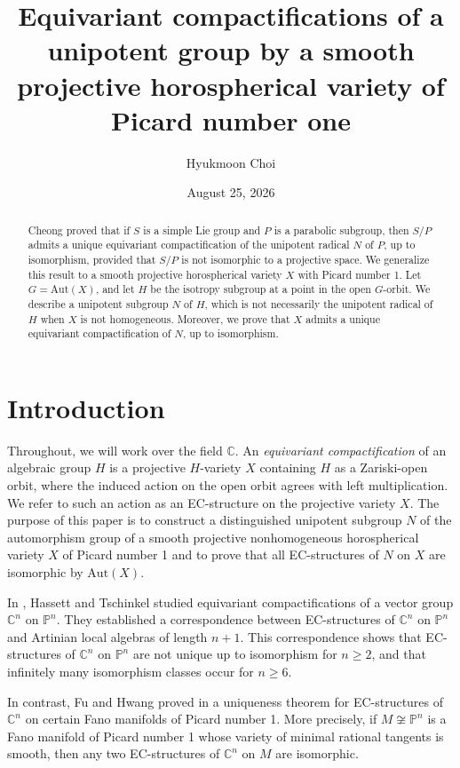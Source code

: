 \documentclass{amsart}
\title[EC structures on certain horospherical varieties]{Equivariant compactifications of a unipotent group by a smooth projective horospherical variety of Picard number one}
\author{Hyukmoon Choi}
\date{August 25, 2026}
\theoremstyle{definition}
\theoremstyle{remark}
\newcommand{\C}{\mathbb{C}}
\begin{document}
\begin{abstract}
Cheong proved that if $S$ is a simple Lie group and $P$ is a parabolic subgroup, then $S/P$ admits a unique equivariant compactification of the unipotent radical $N$ of $P$, up to isomorphism, provided that $S/P$ is not isomorphic to a projective space. We generalize this result to a smooth projective horospherical variety $X$ with Picard number 1. Let $G = \mathrm{Aut}(X)$, and let $H$ be the isotropy subgroup at a point in the open $G$-orbit. We describe a unipotent subgroup $N$ of $H$, which is not necessarily the unipotent radical of $H$ when $X$ is not homogeneous. Moreover, we prove that $X$ admits a unique equivariant compactification of $N$, up to isomorphism.  
\end{abstract}

\maketitle


\section{Introduction}

Throughout, we will work over the field $\C$. An \textit{equivariant compactification} of an algebraic group $H$ is a projective $H$-variety $X$ containing $H$ as a Zariski-open orbit, where the induced action on the open orbit agrees with left multiplication. We refer to such an action as an EC-structure on the projective variety $X$. The purpose of this paper is to construct a distinguished unipotent subgroup $N$ of the automorphism group of a smooth projective nonhomogeneous horospherical variety $X$ of Picard number 1 and to prove that all EC-structures of $N$ on $X$ are isomorphic by $\mathrm{Aut}(X)$.


In \cite{HT}, Hassett and Tschinkel studied equivariant compactifications of a vector group $\C^n$ on $\mathbb{P}^n$. They established a correspondence between EC-structures of $\C^n$ on $\mathbb{P}^n$ and Artinian local algebras of length $n+1$. This correspondence shows that EC-structures of $\C^n$ on $\mathbb{P}^n$ are not unique up to isomorphism for $n \geq 2$, and that infinitely many isomorphism classes occur for $n \geq 6$. 



In contrast, Fu and Hwang proved in \cite{FH} a uniqueness theorem for EC-structures of $\C^n$ on certain Fano manifolds of Picard number 1. More precisely, if $M\not\cong\mathbb{P}^n$ is a Fano manifold of Picard number 1 whose variety of minimal rational tangents is smooth, then any two EC-structures of $\C^n$ on $M$ are isomorphic.
\end{document}
